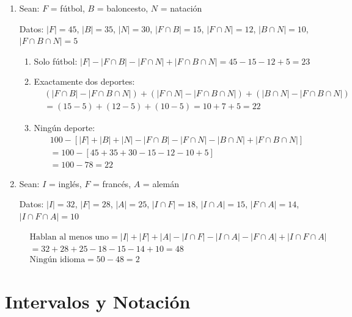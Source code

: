 \documentclass[12pt,a4paper]{article}
\begin{document}
\begin{enumerate}
    \item Sean: $F$ = fútbol, $B$ = baloncesto, $N$ = natación
    
    Datos: $|F| = 45$, $|B| = 35$, $|N| = 30$, $|F \cap B| = 15$, $|F \cap N| = 12$, $|B \cap N| = 10$, $|F \cap B \cap N| = 5$
    
    \begin{enumerate}
        \item Solo fútbol: $|F| - |F \cap B| - |F \cap N| + |F \cap B \cap N| = 45 - 15 - 12 + 5 = 23$
        
        \item Exactamente dos deportes:
        \begin{align*}
            &(|F \cap B| - |F \cap B \cap N|) + (|F \cap N| - |F \cap B \cap N|) + (|B \cap N| - |F \cap B \cap N|)\\
            &= (15 - 5) + (12 - 5) + (10 - 5) = 10 + 7 + 5 = 22
        \end{align*}
        
        \item Ningún deporte:
        \begin{align*}
            &100 - [|F| + |B| + |N| - |F \cap B| - |F \cap N| - |B \cap N| + |F \cap B \cap N|]\\
            &= 100 - [45 + 35 + 30 - 15 - 12 - 10 + 5]\\
            &= 100 - 78 = 22
        \end{align*}
    \end{enumerate}
    
    \item Sean: $I$ = inglés, $F$ = francés, $A$ = alemán
    
    Datos: $|I| = 32$, $|F| = 28$, $|A| = 25$, $|I \cap F| = 18$, $|I \cap A| = 15$, $|F \cap A| = 14$, $|I \cap F \cap A| = 10$
    
    \begin{align*}
        &\text{Hablan al menos uno} = |I| + |F| + |A| - |I \cap F| - |I \cap A| - |F \cap A| + |I \cap F \cap A|\\
        &= 32 + 28 + 25 - 18 - 15 - 14 + 10 = 48\\
        &\text{Ningún idioma} = 50 - 48 = 2
    \end{align*}
\end{enumerate}

\section{Intervalos y Notación}
\end{document}

